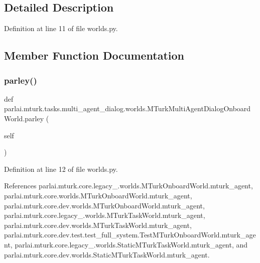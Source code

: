 \subsection{Detailed Description}


Definition at line 11 of file worlds.\+py.



\subsection{Member Function Documentation}
\mbox{\label{classparlai_1_1mturk_1_1tasks_1_1multi__agent__dialog_1_1worlds_1_1MTurkMultiAgentDialogOnboardWorld_a7d4faad98ebcfd2479530e0f10e1d7ca}} 
\subsubsection{\texorpdfstring{parley()}{parley()}}
{\footnotesize\ttfamily def parlai.\+mturk.\+tasks.\+multi\+\_\+agent\+\_\+dialog.\+worlds.\+M\+Turk\+Multi\+Agent\+Dialog\+Onboard\+World.\+parley (\begin{DoxyParamCaption}\item[{}]{self }\end{DoxyParamCaption})}



Definition at line 12 of file worlds.\+py.



References parlai.\+mturk.\+core.\+legacy\+\_.\+worlds.\+M\+Turk\+Onboard\+World.\+mturk\+\_\+agent, parlai.\+mturk.\+core.\+worlds.\+M\+Turk\+Onboard\+World.\+mturk\+\_\+agent, parlai.\+mturk.\+core.\+dev.\+worlds.\+M\+Turk\+Onboard\+World.\+mturk\+\_\+agent, parlai.\+mturk.\+core.\+legacy\+\_.\+worlds.\+M\+Turk\+Task\+World.\+mturk\+\_\+agent, parlai.\+mturk.\+core.\+dev.\+worlds.\+M\+Turk\+Task\+World.\+mturk\+\_\+agent, parlai.\+mturk.\+core.\+dev.\+test.\+test\+\_\+full\+\_\+system.\+Test\+M\+Turk\+Onboard\+World.\+mturk\+\_\+agent, parlai.\+mturk.\+core.\+legacy\+\_.\+worlds.\+Static\+M\+Turk\+Task\+World.\+mturk\+\_\+agent, and parlai.\+mturk.\+core.\+dev.\+worlds.\+Static\+M\+Turk\+Task\+World.\+mturk\+\_\+agent.



